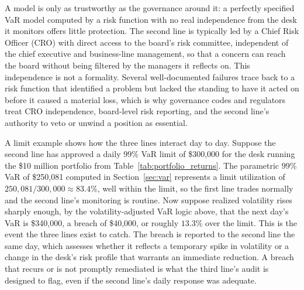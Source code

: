 \documentclass[../ai_in_finance]{subfiles}
\begin{document}
A model is only as trustworthy as the governance around it: a perfectly specified VaR model computed by a risk function with no real independence from the desk it monitors offers little protection.
The second line is typically led by a Chief Risk Officer (CRO) with direct access to the board's risk committee, independent of the chief executive and business-line management, so that a concern can reach the board without being filtered by the managers it reflects on.
This independence is not a formality. Several well-documented failures trace back to a risk function that identified a problem but lacked the standing to have it acted on before it caused a material loss, which is why governance codes and regulators treat CRO independence, board-level risk reporting, and the second line's authority to veto or unwind a position as essential.

A limit example shows how the three lines interact day to day. Suppose the second line has approved a daily 99\% VaR limit of \$300,000 for the desk running the \$10 million portfolio from Table~\ref{tab:portfolio_returns}. The parametric $99\%$ VaR of \$250,081 computed in Section~\ref{sec:var} represents a limit utilization of $250{,}081/300{,}000 \approx 83.4\%$, well within the limit, so the first line trades normally and the second line's monitoring is routine.
Now suppose realized volatility rises sharply enough, by the volatility-adjusted VaR logic above, that the next day's VaR is \$340,000, a breach of \$40,000, or roughly $13.3\%$ over the limit.
This is the event the three lines exist to catch. The breach is reported to the second line the same day, which assesses whether it reflects a temporary spike in volatility or a change in the desk's risk profile that warrants an immediate reduction. A breach that recurs or is not promptly remediated is what the third line's audit is designed to flag, even if the second line's daily response was adequate.

\end{document}

